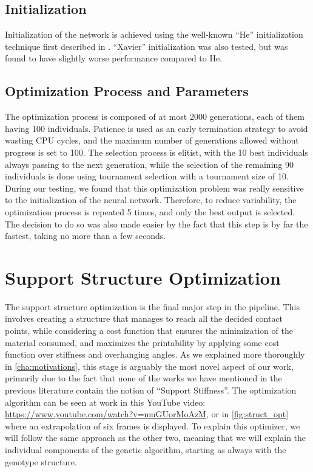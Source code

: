 \subsection{Initialization}
\label{sec:contact_points_grouping_init}

Initialization of the network is achieved using the well-known ``He'' initialization technique
first described in 
\cite{he2015}. ``Xavier'' initialization \cite{xavier2010} was also tested, but was found to have slightly worse
performance compared to He.




\subsection{Optimization Process and Parameters}
\label{sec:contact_points_grouping_par}

The optimization process is composed of at most 2000 generations,
each of them having 100 individuals. Patience is used as an early termination strategy to avoid wasting
CPU cycles, and the maximum number of generations allowed without progress is set to 100.
The selection process is elitist, with the 10 best individuals always passing to the next generation,
while the selection of the remaining 90 individuals is done using tournament selection with a 
tournament size of 10.
During our testing, we found that this optimization problem was really sensitive to the initialization
of the neural network. Therefore, to reduce variability, the optimization process is repeated 5 times,
and only the best output is selected. The decision to do so was also made easier by the fact
that this step is by far the fastest, taking no more than a few seconds.

\section{Support Structure Optimization}
\label{sec:sup_struct_opt}

The support structure optimization is the final major step in the pipeline.
This involves creating a structure that manages to reach all the decided contact points,
while considering a cost function that ensures the minimization of the material consumed,
and maximizes the printability by applying some cost function over stiffness and overhanging
angles.
As we explained more thoroughly in \cref{cha:motivations}, this stage is arguably the most novel aspect of our work, primarily
due to the fact that none of the works we have mentioned in the previous literature
contain the notion of ``Support Stiffness''.
The optimization algorithm can be seen at work in this
YouTube video: \url{https://www.youtube.com/watch?v=muGUorMoAzM},
or in \cref{fig:struct_opt} where an extrapolation of six 
frames is displayed.
To explain this optimizer, we will follow the same approach
as the other two, meaning that we will explain the individual components
of the genetic algorithm, starting as always with the genotype structure.


